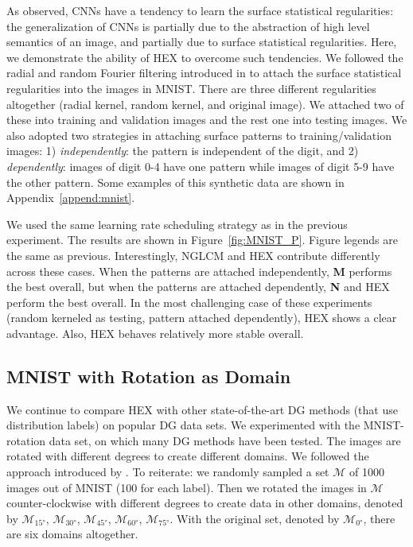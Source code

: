 As \citet{jo2017measuring} observed, 
CNNs have a tendency to learn the surface statistical regularities: 
the generalization of CNNs is partially due to the abstraction of high level semantics of an image, 
and partially due to surface statistical regularities. 
Here, we demonstrate the ability of HEX to overcome such tendencies.
We followed the radial and random Fourier filtering 
introduced in \citep{jo2017measuring} 
to attach the surface statistical regularities 
into the images in MNIST. 
There are three different regularities altogether 
(radial kernel, random kernel, and original image). 
We attached two of these into training and validation images 
and the rest one into testing images. 
We also adopted two strategies in attaching surface patterns to training/validation images: 
1) \textit{independently}: the pattern is independent of the digit,
and 2) \textit{dependently}:
images of digit 0-4 have one pattern while images of digit 5-9 
have the other pattern. 
Some examples of this synthetic data are shown in Appendix~\ref{append:mnist}. 


We used the same learning rate scheduling strategy 
as in the previous experiment. 
The results are shown in Figure~\ref{fig:MNIST_P}.
Figure legends are the same as previous. 
Interestingly, NGLCM and HEX contribute differently across these cases. 
When the patterns are attached independently,
\textbf{M} performs the best overall, 
but when the patterns are attached dependently,
\textbf{N} and HEX perform the best overall.
In the most challenging case of these experiments 
(random kerneled as testing, pattern attached dependently),
HEX shows a clear advantage. 
Also, HEX behaves relatively more stable overall. 


\subsection{MNIST with Rotation as Domain}
We continue to compare HEX with other state-of-the-art DG methods 
(that use distribution labels) on popular DG data sets. 
We experimented with the MNIST-rotation data set, 
on which many DG methods have been tested. 
The images are rotated with different degrees to create different domains. We followed the approach introduced by \citet{ghifary2015domain}.
To reiterate: we randomly sampled a set $\mathcal{M}$ of 1000 images 
out of MNIST (100 for each label). 
Then we rotated the images in $\mathcal{M}$ counter-clockwise 
with different degrees to create data in other domains, 
denoted by $\mathcal{M}_{\ang{15}}$, $\mathcal{M}_{\ang{30}}$, $\mathcal{M}_{\ang{45}}$, $\mathcal{M}_{\ang{60}}$, $\mathcal{M}_{\ang{75}}$. 
With the original set, denoted by $\mathcal{M}_{\ang{0}}$,
there are six domains altogether. 

